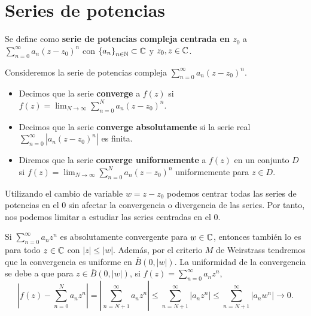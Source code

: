 \section{Series de potencias}
\begin{definition}
	Se define como \textbf{serie de potencias compleja centrada en $\displaystyle z_{0} $} a $\displaystyle \sum^{\infty}_{n = 0}a_{n}\left(z-z_{0}\right)^{n} $ con $\displaystyle \left\{ a_{n}\right\} _{n\in\mathbb{N}}\subset\mathbb{C} $ y $\displaystyle z_{0}, z\in \mathbb{C} $. 
\end{definition}
\begin{definition}[Convergencia]
Consideremos la serie de potencias compleja $\displaystyle \sum^{\infty}_{n = 0}a_{n}\left(z-z_{0}\right)^{n} $. 
\begin{itemize}
\item Decimos que la serie \textbf{converge} a $\displaystyle f\left(z\right)  $ si $\displaystyle f\left(z\right)=\lim_{N \to \infty }\sum^{N}_{n = 0}a_{n}\left(z-z_{0}\right)^{n} $.
\item Decimos que la serie \textbf{converge absolutamente} si la serie real $\displaystyle \sum^{\infty}_{n = 0} \left|a_{n} \left(z-z_{0}\right)^{n}\right| $ es finita.
\item Diremos que la serie \textbf{converge uniformemente} a $\displaystyle f\left(z\right) $ en un conjunto $\displaystyle D $ si $\displaystyle f\left(z\right)=\lim_{N \to \infty}\sum^{N}_{n = 0}a_{n}\left(z-z_{0}\right)^{n} $ uniformemente para $\displaystyle z \in D $.
\end{itemize}
\end{definition}
Utilizando el cambio de variable $\displaystyle w = z - z_{0} $ podemos centrar todas las series de potencias en el 0 sin afectar la convergencia o divergencia de las series. Por tanto, nos podemos limitar a estudiar las series centradas en el 0.
\begin{observation}
Si $\displaystyle \sum^{\infty}_{n = 0}a_{n}z^{n} $ es absolutamente convergente para $\displaystyle w \in \mathbb{C} $, entonces también lo es para todo $\displaystyle z \in \mathbb{C} $ con $\displaystyle \left|z\right|\leq \left|w\right| $. Además, por el criterio $\displaystyle M $ de Weirstrass tendremos que la convergencia es uniforme en $\displaystyle \overline{B}\left(0, \left|w\right|\right) $.  
La uniformidad de la convergencia se debe a que para $\displaystyle z \in \overline{B}\left(0, \left|w\right|\right) $, si $\displaystyle f\left(z\right)=\sum^{\infty}_{n = 0}a_{n}z^{n} $,
\[ \left|f\left(z\right)-\sum^{N}_{n = 0}a_{n}z^{n}\right|= \left|\sum^{\infty}_{n = N + 1}a_{n}z^{n}\right|\leq \sum^{\infty}_{n = N + 1} \left|a_{n}z^{n}\right|\leq \sum^{\infty}_{n = N + 1} \left|a_{n}w^{n}\right|\to 0 .\]
\end{observation}
